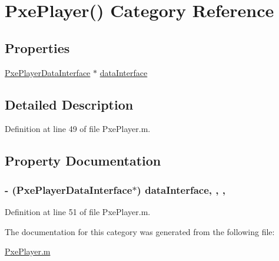 \hypertarget{category_pxe_player_07_08}{\section{Pxe\-Player() Category Reference}
\label{category_pxe_player_07_08}
}
\subsection*{Properties}
\begin{DoxyCompactItemize}
\item 
\hyperlink{interface_pxe_player_data_interface}{Pxe\-Player\-Data\-Interface} $\ast$ \hyperlink{category_pxe_player_07_08_a2b4c72b789a077b36de37eb9bcfb4d76}{data\-Interface}
\end{DoxyCompactItemize}


\subsection{Detailed Description}


Definition at line 49 of file Pxe\-Player.\-m.



\subsection{Property Documentation}
\hypertarget{category_pxe_player_07_08_a2b4c72b789a077b36de37eb9bcfb4d76}{
\subsubsection[{data\-Interface}]{\setlength{\rightskip}{0pt plus 5cm}-\/ ({\bf Pxe\-Player\-Data\-Interface}$\ast$) data\-Interface\hspace{0.3cm}{\ttfamily [read]}, {\ttfamily [write]}, {\ttfamily [nonatomic]}, {\ttfamily [strong]}}}\label{category_pxe_player_07_08_a2b4c72b789a077b36de37eb9bcfb4d76}


Definition at line 51 of file Pxe\-Player.\-m.



The documentation for this category was generated from the following file\-:\begin{DoxyCompactItemize}
\item 
\hyperlink{_pxe_player_8m}{Pxe\-Player.\-m}\end{DoxyCompactItemize}
